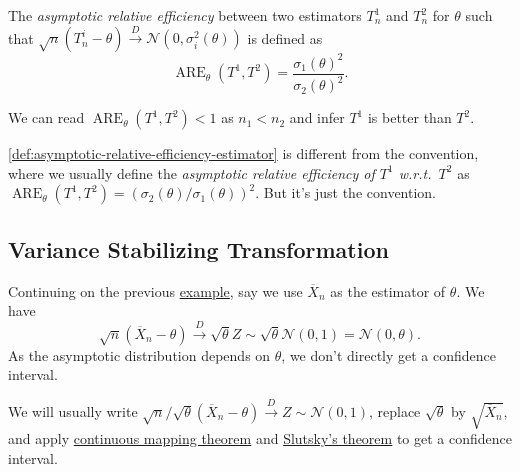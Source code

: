 \begin{definition}\label{def:asymptotic-relative-efficiency-estimator}
	The \emph{asymptotic relative efficiency} between two estimators \(T^1_n\) and \(T^2_n\) for \(\theta \) such that \(\sqrt{n} (T_n^i - \theta ) \overset{D}{\to} \mathcal{N} (0, \sigma _i^2(\theta ))\) is defined as
	\[
		\operatorname{ARE}_\theta (T^1, T^2) = \frac{\sigma _1(\theta )^2}{\sigma _2(\theta )^2}.
	\]
\end{definition}

\begin{intuition}
	We can read \(\operatorname{ARE}_\theta (T^1, T^2) < 1\) as \(n_1 < n_2\) and infer \(T^1\) is better than \(T^2\).
\end{intuition}

\begin{note}
	\autoref{def:asymptotic-relative-efficiency-estimator} is different from the convention, where we usually define the \emph{asymptotic relative efficiency of \(T^1\) w.r.t.\ \(T^2\)} as \(\operatorname{ARE}_\theta (T^1, T^2) = (\sigma _2(\theta ) / \sigma _1(\theta ))^2\). But it's just the convention.
\end{note}

\subsection{Variance Stabilizing Transformation}
Continuing on the previous \hyperref[eg:ARE]{example}, say we use \(\overline{X} _n\) as the estimator of \(\theta \). We have
\[
	\sqrt{n} (\overline{X} _n - \theta ) \overset{D}{\to} \sqrt{\theta } Z \sim \sqrt{\theta } \mathcal{N} (0, 1) = \mathcal{N} (0, \theta ) .
\]
As the asymptotic distribution depends on \(\theta \), we don't directly get a confidence interval.

\begin{prev}
	We will usually write \(\sqrt{n} / \sqrt{\theta } (\overline{X} _n - \theta ) \overset{D}{\to} Z \sim \mathcal{N} (0, 1)\), replace \(\sqrt{\theta } \) by \(\sqrt{\overline{X} _n} \), and apply \hyperref[thm:continuous-mapping]{continuous mapping theorem} and \hyperref[thm:Slutsky]{Slutsky's theorem} to get a confidence interval.
\end{prev}


